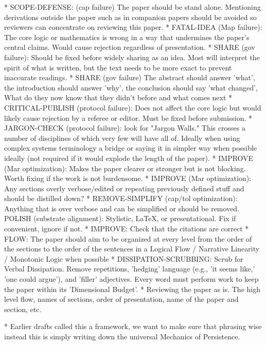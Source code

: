 * SCOPE-DEFENSE: (cap failure) The paper should be stand alone.  Mentioning derivations outside the paper such as in companion papers should be avoided so reviewers can concentrate on reviewing this paper.
* FATAL-IDEA (Map failure): The core logic or mathematics is wrong in a way that undermines the paper's central claims. Would cause rejection regardless of presentation.
* SHARE (gov failure): Should be fixed before widely sharing as an idea.  Most will interpret the spirit of what is written, but the text needs to be more exact to prevent inaccurate readings.
* SHARE (gov failure) The abstract should answer 'what', the introduction should answer 'why', the conclusion should say 'what changed', What do they now know that they didn't before and what comes next
* CRITICAL-PUBLISH (protocol failure): Does not affect the core logic but would likely cause rejection by a referee or editor. Must be fixed before submission.
* JARGON-CHECK (protocol failure): look for "Jargon Walls." This crosses a number of disciplines of which very few will have all of.  Ideally when using complex systems terminology a bridge or saying it in simpler way when possible ideally (not required if it would explode the length of the paper).
* IMPROVE (Mar optimization): Makes the paper clearer or stronger but is not blocking. Worth fixing if the work is not burdensome.
* IMPROVE (Mar optimization): Any sections overly verbose/edited or repeating previously defined stuff and should be distilled down?
* REMOVE-SIMPLIFY (cap/tol optimization): Anything that is over verbose and can be simplified or should be removed.
POLISH (substrate alignment): Stylistic, LaTeX, or presentational. Fix if convenient, ignore if not.
* IMPROVE: Check that the citations are correct
* FLOW: The paper should aim to be organized at every level from the order of the sections to the order of the sentences in a Logical Flow / Narrative Linearity / Monotonic Logic when possible
* DISSIPATION-SCRUBBING: Scrub for Verbal Dissipation. Remove repetitions, 'hedging' language (e.g., 'it seems like,' 'one could argue'), and 'filler' adjectives. Every word must perform work to keep the paper within its 'Dimensional Budget'.
* Reviewing the paper as is.  The high level flow, names of sections, order of presentation, name of the paper and section, etc.

* Earlier drafts called this a framework, we want to make sure that phrasing wise instead this is simply writing down the universal Mechanics of Persistence.

